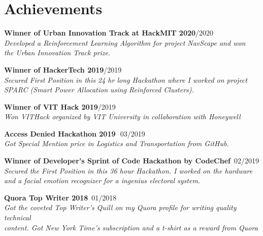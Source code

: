 \documentclass[a4paper, 12pt]{article}
\begin{document}
	\section*{Achievements}
	\begin{flushleft}
		\textbf{Winner of Urban Innovation Track at HackMIT 2020}\quad\qquad\qquad\quad\quad\quad\quad\qquad{}/2020\\\textit{Developed a Reinforcement Learning Algorithm for project NavScape and won\\ the Urban Innovation Track prize.}
	\end{flushleft}
	
	\begin{flushleft}
		\textbf{Winner of HackerTech 2019}\qquad\qquad\qquad\qquad\qquad\qquad\qquad\qquad\qquad\qquad\quad\quad\qquad{}/2019\\\textit{Secured First Position in this 24 hr long Hackathon where I worked on project\\SPARC (Smart Power Allocation using Reinforced Clusters).}
	\end{flushleft}
	
	\begin{flushleft}
		\textbf{Winner of VIT Hack 2019}\qquad\qquad\qquad\qquad\qquad\qquad\qquad\qquad\qquad\qquad\qquad\quad\qquad{}/2019\\\textit{Won VITHack organized by VIT University in collaboration with Honeywell}
	\end{flushleft}
	
	\begin{flushleft}
		\textbf{Access Denied Hackathon 2019}\qquad\qquad\qquad\qquad\qquad\qquad\qquad\qquad\qquad\qquad\qquad\quad\quad\,\, 03/2019\\\textit{Got Special Mention price in Logistics and Transportation from GitHub.}
	\end{flushleft}

    \begin{flushleft}
        \textbf{Winner of Developer's Sprint of Code Hackathon by CodeChef}\qquad\qquad\qquad\qquad\, 02/2019\\\textit{Secured the First Position in this 36 hour Hackathon. I worked on the hardware\\ and a facial emotion recognizer for a ingenius electoral system.}
    \end{flushleft}
    
    \begin{flushleft}
        \textbf{Quora Top Writer 2018}\qquad\qquad\qquad\qquad\qquad\qquad\qquad\qquad\qquad\qquad\qquad\qquad\qquad\qquad\, 01/2018\\\textit{Got the coveted Top Writer's Quill on my Quora profile for writing quality technical\\ content. Got New York Time's subscription and a t-shirt as a reward from Quora}
    \end{flushleft}
    
\end{document}
